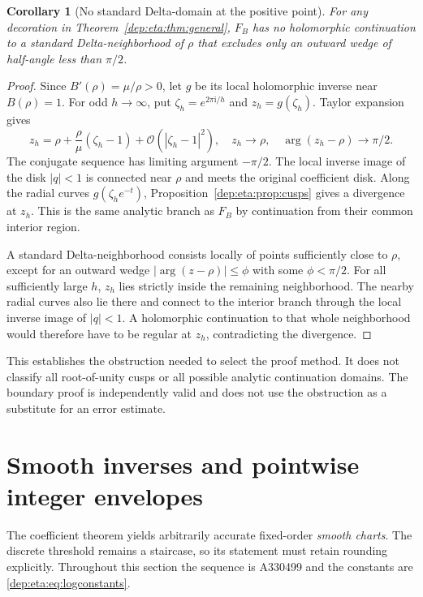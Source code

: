\documentclass[11pt]{article}
\newtheorem{corollary}[theorem]{Corollary}
\theoremstyle{definition}\newtheorem{definition}[theorem]{Definition}
\theoremstyle{remark}\newtheorem{remark}[theorem]{Remark}
\newcommand{\OO}{\mathcal O}
\newcommand{\ii}{\mathrm i}
\begin{document}
\begin{corollary}[No standard Delta-domain at the positive point]\label{dep:eta:cor:delta}
For any decoration in Theorem~\ref{dep:eta:thm:general}, $F_B$ has no
holomorphic continuation to a standard Delta-neighborhood of $\rho$
that excludes only an outward wedge of half-angle less than $\pi/2$.
\end{corollary}
\begin{proof}
Since $B'(\rho)=\mu/\rho>0$, let $g$ be its local holomorphic
inverse near $B(\rho)=1$. For odd $h\to\infty$, put
$\zeta_h=e^{2\pi\ii/h}$ and $z_h=g(\zeta_h)$. Taylor expansion gives
\[
 z_h=\rho+\frac\rho\mu(\zeta_h-1)+\OO(|\zeta_h-1|^2),
 \quad z_h\to\rho,\quad \arg(z_h-\rho)\to\pi/2.
\]
The conjugate sequence has limiting argument $-\pi/2$.
The local inverse image of the disk $|q|<1$ is connected near
$\rho$ and meets the original coefficient disk. Along the radial
curves $g(\zeta_he^{-t})$, Proposition~\ref{dep:eta:prop:cusps} gives a
divergence at $z_h$. This is the same analytic branch as $F_B$ by
continuation from their common interior region.

A standard Delta-neighborhood consists locally of points sufficiently
close to $\rho$, except for an outward wedge
$|\arg(z-\rho)|\le\phi$ with some $\phi<\pi/2$.
For all sufficiently large $h$, $z_h$ lies strictly inside the
remaining neighborhood. The nearby radial curves also lie there and
connect to the interior branch through the local inverse image of
$|q|<1$. A holomorphic continuation to that whole neighborhood would
therefore have to be regular at $z_h$, contradicting the divergence.
\end{proof}

This establishes the obstruction needed to select the proof method.
It does not classify all root-of-unity cusps or all possible analytic
continuation domains. The boundary proof is independently valid and
does not use the obstruction as a substitute for an error estimate.

\section{Smooth inverses and pointwise integer envelopes}\label{dep:eta:sec:inverse}
The coefficient theorem yields arbitrarily accurate fixed-order
\emph{smooth charts}. The discrete threshold remains a staircase, so
its statement must retain rounding explicitly. Throughout this
section the sequence is A330499 and the constants are
\eqref{dep:eta:eq:logconstants}.
\end{document}
